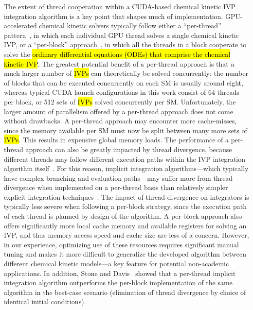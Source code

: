 \documentclass[preprint,review,11pt]{elsarticle}
\DeclareRobustCommand{\hlg}[1]{\sethlcolor{green}\hl{#1}}
\begin{document}
The extent of thread cooperation within a CUDA-based chemical kinetic IVP integration algorithm is a key point that shapes much of implementation.
GPU-accelerated chemical kinetic solvers typically follow either a ``per-thread'' pattern~\cite{Niemeyer:2011aa,Stone:2013aa,Niemeyer:2014aa}, in which each individual GPU thread solves a single chemical kinetic IVP, or a ``per-block'' approach~\cite{Stone:2013aa,Sewerin20151375}, in which all the threads in a block cooperate to solve the \hlg{ordinary differential equations (ODEs) that comprise the chemical kinetic IVP}.
The greatest potential benefit of a per-thread approach is that a much larger number of \hlg{IVPs} can theoretically be solved concurrently; the number of blocks that can be executed concurrently on each SM is usually around eight, whereas typical CUDA launch configurations in this work consist of 64 threads per block, or 512 sets of \hlg{IVPs} solved concurrently per SM.
Unfortunately, the larger amount of parallelism offered by a per-thread approach does not come without drawbacks.
A per-thread approach may encounter more cache-misses, since the memory available per SM must now be split between many more sets of \hlg{IVPs}.
This results in expensive global memory loads.
The performance of a per-thread approach can also be greatly impacted by thread divergence, because different threads may follow different execution paths within the IVP integration algorithm itself~\cite{Stone:2013aa,Niemeyer:2014aa}.
For this reason, implicit integration algorithms---which typically have complex branching and evaluation paths---may suffer more from thread divergence when implemented on a per-thread basis than relatively simpler explicit integration techniques~\cite{Stone:2013aa}.
The impact of thread divergence on integrators is typically less severe when following a per-block strategy, since the execution path of each thread is planned by design of the algorithm.
A per-block approach also offers significantly more local cache memory and available registers for solving an IVP, and thus memory access speed and cache size are less of a concern.
However, in our experience, optimizing use of these resources requires significant manual tuning and makes it more difficult to generalize the developed algorithm between different chemical kinetic models---a key feature for potential non-academic applications.
In addition, Stone and Davis~\cite{Stone:2013aa} showed that a per-thread implicit integration algorithm outperforms the per-block implementation of the same algorithm in the best-case scenario (elimination of thread divergence by choice of identical initial conditions).
\end{document}
